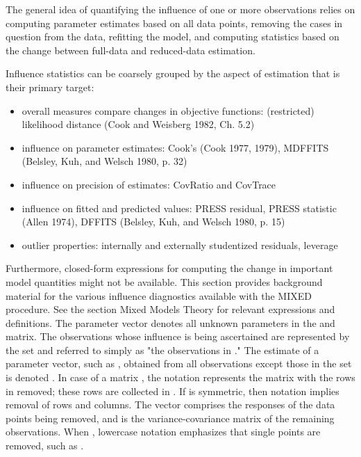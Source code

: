 \documentclass[12pt, a4paper]{report}
\theoremstyle{plain}
\theoremstyle{definition}
\theoremstyle{remark}
\begin{document}
The general idea of quantifying the influence of one or more observations relies on computing parameter estimates based on all data points, removing the cases in question from the data, refitting the model, and computing statistics based on the change between full-data and reduced-data estimation. 


Influence statistics can be coarsely grouped by the aspect of estimation that is their primary target:
\begin{itemize}
	\item overall measures compare changes in objective functions: (restricted) likelihood distance (Cook and Weisberg 1982, Ch. 5.2)
	\item influence on parameter estimates: Cook’s  (Cook 1977, 1979), MDFFITS (Belsley, Kuh, and Welsch 1980, p. 32)
	\item influence on precision of estimates: CovRatio and CovTrace
	\item influence on fitted and predicted values: PRESS residual, PRESS statistic (Allen 1974), DFFITS (Belsley, Kuh, and Welsch 1980, p. 15)
	\item outlier properties: internally and externally studentized residuals, leverage
\end{itemize}

Furthermore, closed-form expressions for computing the change in important model quantities might not be available.
This section provides background material for the various influence diagnostics available with the MIXED procedure. See the section Mixed Models Theory for relevant expressions and definitions. The parameter vector  denotes all unknown parameters in the  and  matrix.
The observations whose influence is being ascertained are represented by the set  and referred to simply as "the observations in ." The estimate of a parameter vector, such as , obtained from all observations except those in the set  is denoted . In case of a matrix , the notation  represents the matrix with the rows in  removed; these rows are collected in . If  is symmetric, then notation  implies removal of rows and columns. The vector  comprises the responses of the data points being removed, and  is the variance-covariance matrix of the remaining observations. When , lowercase notation emphasizes that single points are removed, such as .
\end{document}
